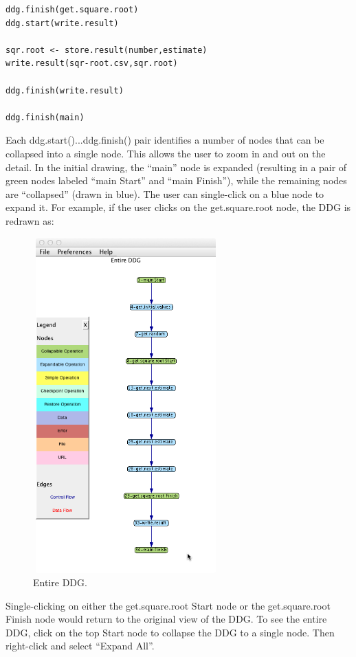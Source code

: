 \documentclass[12pt]{article}
\begin{document}
{\begin{lstlisting}
ddg.finish(get.square.root)
ddg.start(write.result)

sqr.root <- store.result(number,estimate)
write.result(sqr-root.csv,sqr.root)

ddg.finish(write.result)

ddg.finish(main)

\end{lstlisting}

{\mdseries\upshape\color{black}
Each ddg.start()...ddg.finish() pair identifies a number of nodes that can be collapsed into a single node. This allows the user to zoom in and out on the detail. In the initial drawing, the “main” node is expanded (resulting in a pair of green nodes labeled “main Start” and “main Finish”), while the remaining nodes are “collapsed” (drawn in blue). The user can single-click on a blue node to expand it. For example, if the user clicks on the get.square.root node, the DDG is redrawn as:}
\begin{figure}[h!]
\centering
  \caption{Entire DDG.}
 \includegraphics[width=2.8083in,height=5.0835in]{UsingDDGExplorer-img/UsingDDGExplorer-img003.png} 
\end{figure}
{\mdseries\upshape\color{black}
Single-clicking on either the get.square.root Start node or the get.square.root Finish node would return to the original view of the DDG. To see the entire DDG, click on the top Start node to collapse the DDG to a single node. Then right-click and select “Expand All”.}

}
\end{document}
